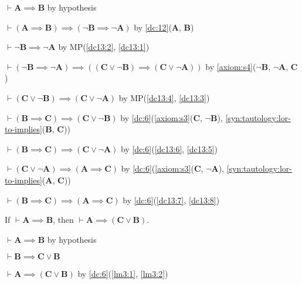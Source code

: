 \documentclass{amsart}%
\newcommand\metavariable[1]{\boldsymbol{#1}}
\begin{document}
\begin{pf}
\item\label{dc13:1} $\vdash\metavariable{A}\implies\metavariable{B}$ by hypothesis
\item\label{dc13:2} $\vdash(\metavariable{A}\implies\metavariable{B})\implies(\neg\metavariable{B}\implies\neg\metavariable{A})$
  by \ref{dc:12}($\metavariable{A}$, $\metavariable{B}$)
\item\label{dc13:3} $\vdash\neg\metavariable{B}\implies\neg\metavariable{A}$
  by MP(\ref{dc13:2}, \ref{dc13:1})
\item\label{dc13:4} $\vdash(\neg\metavariable{B}\implies\neg\metavariable{A})\implies((\metavariable{C}\lor\neg\metavariable{B})\implies(\metavariable{C}\lor\neg\metavariable{A}))$
  by \ref{axiom:s4}($\neg\metavariable{B}$, $\neg\metavariable{A}$, $\metavariable{C}$)
\item\label{dc13:5} $\vdash(\metavariable{C}\lor\neg\metavariable{B})\implies(\metavariable{C}\lor\neg\metavariable{A})$
  by MP(\ref{dc13:4}, \ref{dc13:3})
\item\label{dc13:6} $\vdash(\metavariable{B}\implies\metavariable{C})\implies(\metavariable{C}\lor\neg\metavariable{B})$
  by \ref{dc:6}(\ref{axiom:s3}($\metavariable{C}$, $\neg\metavariable{B}$),
  \ref{syn:tautology:lor-to-implies}($\metavariable{B}$, $\metavariable{C}$))
\item\label{dc13:7} $\vdash(\metavariable{B}\implies\metavariable{C})\implies(\metavariable{C}\lor\neg\metavariable{A})$
  by \ref{dc:6}(\ref{dc13:6}, \ref{dc13:5})
\item\label{dc13:8} $\vdash(\metavariable{C}\lor\neg\metavariable{A})\implies(\metavariable{A}\implies\metavariable{C})$
  by \ref{dc:6}(\ref{axiom:s3}($\metavariable{C}$, $\neg\metavariable{A}$),
  \ref{syn:tautology:lor-to-implies}($\metavariable{A}$, $\metavariable{C}$))
\item $\vdash(\metavariable{B}\implies\metavariable{C})\implies(\metavariable{A}\implies\metavariable{C})$
  by \ref{dc:6}(\ref{dc13:7}, \ref{dc13:8})
\end{pf}

\begin{lemma}\label{lem:prop:weakening-l}
If $\vdash\metavariable{A}\implies\metavariable{B}$, then
$\vdash\metavariable{A}\implies(\metavariable{C}\lor\metavariable{B})$.
\end{lemma}

\begin{pf}
\item\label{lm3:1} $\vdash\metavariable{A}\implies\metavariable{B}$ by hypothesis
\item\label{lm3:2} $\vdash\metavariable{B}\implies\metavariable{C}\lor\metavariable{B}$ 
\item $\vdash\metavariable{A}\implies(\metavariable{C}\lor\metavariable{B})$
  by \ref{dc:6}(\ref{lm3:1}, \ref{lm3:2})
\end{pf}
\end{document}
